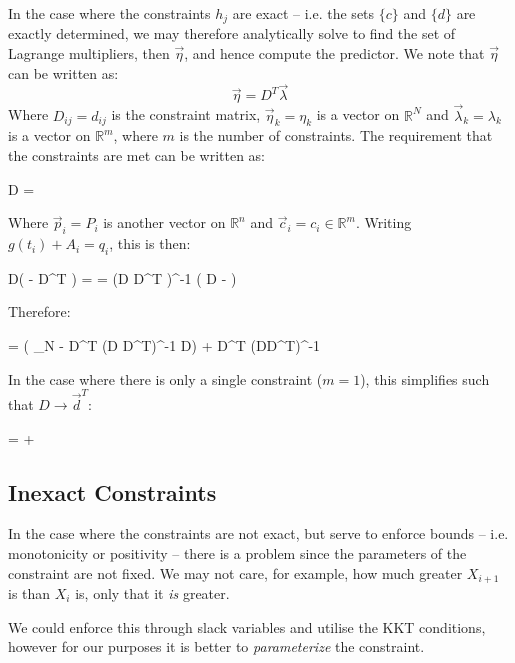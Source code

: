 \documentclass[]{article}
\begin{document}
			In the case where the constraints $h_j$ are exact -- i.e. the sets $\{c\}$ and $\{d\}$ are exactly determined, we may therefore analytically solve to find the set of Lagrange multipliers, then $\vec{\eta}$, and hence compute the predictor. We note that $\vec{\eta}$ can be written as:
			\begin{equation}
				\vec{\eta} = D^T \vec{\lambda}
			\end{equation}
			Where $D_{ij} = d_{ij}$ is the constraint matrix, $\vec{\eta}_k = \eta_k$ is a vector on $\mathbb{R}^N$ and $\vec{\lambda}_k = \lambda_k$ is a vector on $\mathbb{R}^m$, where $m$ is the number of constraints. The requirement that the constraints are met can be written as:
			\begin{spalign}
				D  = 
			\end{spalign} 
			Where $\vec{p}_i = P_i$ is another vector on $\mathbb{R}^n$ and $\vec{c}_i = c_i \in \mathbb{R}^m$. Writing $g(t_i) + A_i = q_i$, this is then:
			\begin{spalign}
				D\left( -  D^T \vec{\lambda} \right) =  \LLR \vec{\lambda} =  \left(D D^T \right)^{-1} \left( D  - \vec{c} \right)
			\end{spalign}
			Therefore:
			\begin{spalign}
				 =  \left( _N - D^T (D D^T)^{-1} D\right) + D^T (DD^T)^{-1}  \label{E:ConstrainedSolution}
			\end{spalign}
			In the case where there is only a single constraint ($m=1$), this simplifies such that $D \to \vec{d}^T$:
			\begin{spalign}
				 = \vec{q} + \frac{c - \cdot \vec{d}}{\vec{d}^2} \vec{d} 
			\end{spalign}
			
		\subsection{Inexact Constraints}

			In the case where the constraints are not exact, but serve to enforce bounds -- i.e. monotonicity or positivity -- there is a problem since the parameters of the constraint are not fixed. We may not care, for example, how much greater $X_{i+1}$ is than $X_i$ is, only that it \textit{is} greater. 

			We could enforce this through slack variables and utilise the KKT conditions, however for our purposes it is better to \textit{parameterize} the constraint. 
\end{document}
